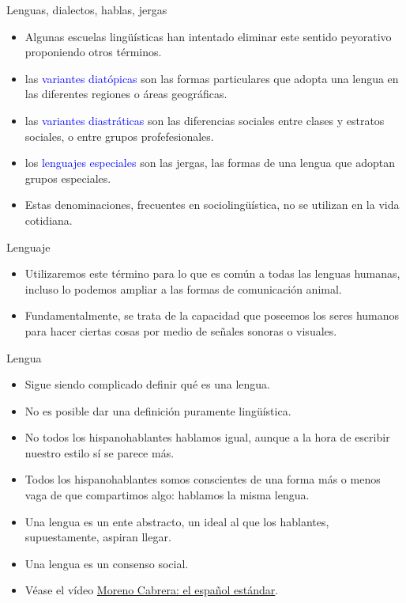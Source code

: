 \documentclass[handout]{beamer}
\begin{document}
\begin{frame}{Lenguas, dialectos, hablas, jergas}
\begin{itemize}
	\item Algunas escuelas lingüísticas han intentado eliminar este sentido peyorativo proponiendo otros términos.
	\item las \textcolor{blue}{variantes diatópicas} son las formas particulares que adopta una lengua en las diferentes regiones o áreas geográficas.
	\item las \textcolor{blue}{variantes diastráticas} son las diferencias sociales entre clases y estratos sociales, o entre grupos profefesionales.
	\item los \textcolor{blue}{lenguajes especiales} son las jergas, las formas de una lengua que adoptan grupos especiales.	
	\item Estas denominaciones, frecuentes en sociolingüística, no se utilizan en la vida cotidiana.
\end{itemize}
\end{frame}

\begin{frame}{Lenguaje}
\begin{itemize}
	\item Utilizaremos este término para lo que es común a todas las lenguas humanas, incluso lo podemos ampliar a las formas de comunicación animal.
	\item Fundamentalmente, se trata de la capacidad que poseemos los seres humanos para hacer ciertas cosas por medio de señales sonoras o visuales.
\end{itemize}
\end{frame}


\begin{frame}{Lengua}
\begin{itemize}
	\item Sigue siendo complicado definir qué es una lengua.
	\item No es posible dar una definición puramente lingüística.
	\item No todos los hispanohablantes hablamos igual, aunque a la hora de escribir nuestro estilo sí se parece más.
	\item Todos los hispanohablantes somos conscientes de una forma más o menos vaga de que compartimos algo: hablamos la misma lengua.
	\item Una lengua es un ente abstracto, un ideal al que los hablantes, supuestamente, aspiran llegar.
	\item Una lengua es un consenso social.
	\item Véase el vídeo \href{http://www.youtube.com/watch?v=sBiM3ELPjXs}{Moreno Cabrera: el español estándar}.

\end{itemize}

\end{frame}
\end{document}
